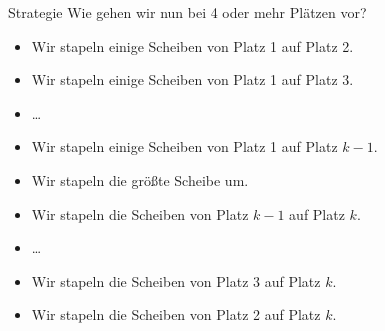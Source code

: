 \begin{frame}{Strategie}
    Wie gehen wir nun bei 4 oder mehr Plätzen vor?
    \begin{itemize}
        \item Wir stapeln einige Scheiben von Platz 1 auf Platz 2.
        \item Wir stapeln einige Scheiben von Platz 1 auf Platz 3.
        \item \dots
        \item Wir stapeln einige Scheiben von Platz 1 auf Platz $k-1$.
        \item Wir stapeln die größte Scheibe um.
        \item Wir stapeln die Scheiben von Platz $k-1$ auf Platz $k$.
        \item \dots
        \item Wir stapeln die Scheiben von Platz 3 auf Platz $k$.
        \item Wir stapeln die Scheiben von Platz 2 auf Platz $k$.
    \end{itemize}
\end{frame}